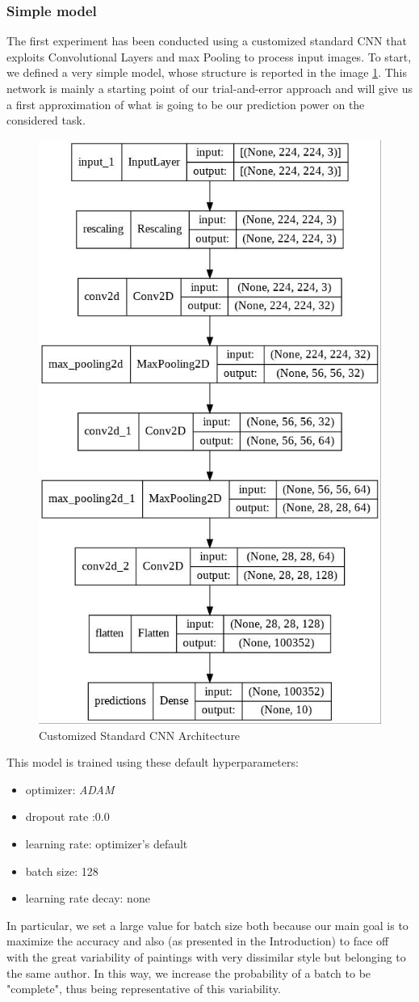 \subsubsection{Simple model}
The first experiment has been conducted using a customized standard CNN that exploits Convolutional Layers and max Pooling to process input images. To start, we defined a very simple model, whose structure is reported in the image \ref{fig:standardCNN}. This network is mainly a starting point of our trial-and-error approach and will give us a first approximation of what is going to be our prediction power on the considered task.
\begin{figure}[H]
	\centering
	\includegraphics[height=0.6\textwidth]{img/scratch/standardCNN.jpg}
	\caption{Customized Standard CNN Architecture}
	\label{fig:standardCNN}
\end{figure}

\noindent This model is trained using these default hyperparameters:
\begin{itemize}
\item optimizer: \textit{ADAM}
\item dropout rate :0.0
\item learning rate: optimizer's default
\item batch size: 128
\item learning rate decay: none
\end{itemize}

\noindent In particular, we set a large value for batch size both because our main goal is to maximize the accuracy and also (as presented in the Introduction) to face off with the great variability of paintings with very dissimilar style but belonging to the same author. In this way, we increase the probability of a batch to be "complete", thus being representative of this variability.

